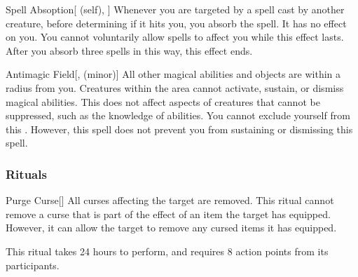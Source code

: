 \lowercase{\hypertarget{spell:Spell Absoption}{}}\label{spell:Spell Absoption}
\begin{attuneability}[Rank 7]{\hypertarget{spell:Spell Absoption}{Spell Absoption}}[ (self), ]
Whenever you are targeted by a spell cast by another creature, before determining if it hits you, you absorb the spell.
It has no effect on you.
You cannot voluntarily allow spells to affect you while this effect lasts.
After you absorb three spells in this way, this effect ends.
\end{attuneability}
\vspace{0.25em}



\lowercase{\hypertarget{spell:Antimagic Field}{}}\label{spell:Antimagic Field}
\begin{freeability}[Rank 8]{\hypertarget{spell:Antimagic Field}{Antimagic Field}}[,  (minor)]
All other magical abilities and objects are  within a \areamed radius  from you.
Creatures within the area cannot activate, sustain, or dismiss magical abilities.
This does not affect aspects of creatures that cannot be suppressed, such as the knowledge of abilities.
You cannot exclude yourself from this .
However, this spell does not prevent you from sustaining or dismissing this spell.
\end{freeability}
\vspace{0.25em}



\subsubsection{Rituals}


\lowercase{\hypertarget{spell:Purge Curse}{}}\label{spell:Purge Curse}
\begin{apability}[Rank 3]{\hypertarget{spell:Purge Curse}{Purge Curse}}[]
All curses affecting the target are removed.
This ritual cannot remove a curse that is part of the effect of an item the target has equipped.
However, it can allow the target to remove any cursed items it has equipped.

This ritual takes 24 hours to perform, and requires 8 action points from its participants.
\end{apability}
\vspace{0.25em}


